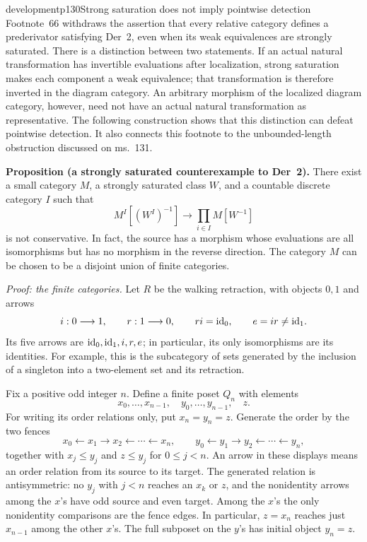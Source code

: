\begin{dcomment}{development}{p130}{Strong saturation does not imply pointwise detection}
Footnote~66 withdraws the assertion that every relative category defines a prederivator satisfying Der~2, even when its weak equivalences are strongly saturated. There is a distinction between two statements. If an actual natural transformation has invertible evaluations after localization, strong saturation makes each component a weak equivalence; that transformation is therefore inverted in the diagram category. An arbitrary morphism of the localized diagram category, however, need not have an actual natural transformation as representative. The following construction shows that this distinction can defeat pointwise detection. It also connects this footnote to the unbounded-length obstruction discussed on ms.~131.

\textbf{Proposition (a strongly saturated counterexample to Der~2).}\ours
There exist a small category $M$, a strongly saturated class $W$, and a countable discrete category $I$ such that
\[
 M^I[(W^I)^{-1}]\longrightarrow\prod_{i\in I}M[W^{-1}]
\]
is not conservative. In fact, the source has a morphism whose evaluations are all isomorphisms but has no morphism in the reverse direction. The category $M$ can be chosen to be a disjoint union of finite categories.

\textit{Proof: the finite categories.}
Let $R$ be the walking retraction, with objects $0,1$ and arrows
\[
 i:0\longrightarrow1,\qquad r:1\longrightarrow0,\qquad
 ri=\mathrm{id}_0,\qquad e=ir\ne\mathrm{id}_1.
\]
Its five arrows are $\mathrm{id}_0,\mathrm{id}_1,i,r,e$; in particular, its only isomorphisms are its identities. For example, this is the subcategory of sets generated by the inclusion of a singleton into a two-element set and its retraction.

Fix a positive odd integer $n$. Define a finite poset $Q_n$ with elements
\[
 x_0,\ldots,x_{n-1},\quad y_0,\ldots,y_{n-1},\quad z.
\]
For writing its order relations only, put $x_n=y_n=z$. Generate the order by the two fences
\[
 x_0\longleftarrow x_1\longrightarrow x_2\longleftarrow\cdots
 \longleftarrow x_n,
 \qquad
 y_0\longleftarrow y_1\longrightarrow y_2\longleftarrow\cdots
 \longleftarrow y_n,
\]
together with $x_j\leq y_j$ and $z\leq y_j$ for $0\leq j<n$. An arrow in these displays means an order relation from its source to its target. The generated relation is antisymmetric: no $y_j$ with $j<n$ reaches an $x_k$ or $z$, and the nonidentity arrows among the $x$'s have odd source and even target. Among the $x$'s the only nonidentity comparisons are the fence edges. In particular, $z=x_n$ reaches just $x_{n-1}$ among the other $x$'s. The full subposet on the $y$'s has initial object $y_n=z$.


\end{dcomment}
